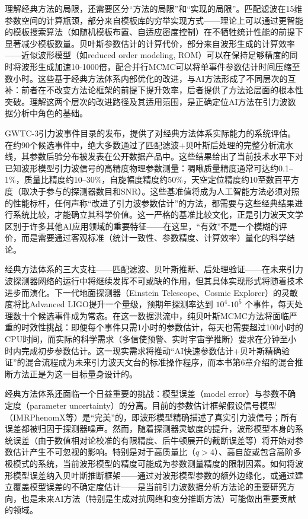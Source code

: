 理解经典方法的局限，还需要区分“方法的局限”和“实现的局限”。匹配滤波在15维参数空间的计算瓶颈，部分来自模板库的穷举实现方式——理论上可以通过更智能的模板搜索算法（如随机模板布置、自适应密度控制）在不牺牲统计性能的前提下显著减少模板数量。贝叶斯参数估计的计算代价，部分来自波形生成的计算效率——近似波形模型（如reduced order modeling, ROM）可以在保持足够精度的同时将波形生成加速10-1000倍，配合并行MCMC可以将单事件参数估计时间压缩至数小时。这些基于经典方法体系内部优化的改进，与AI方法形成了不同层次的互补：前者在不改变方法论框架的前提下提升效率，后者提供了方法论层面的根本性突破。理解这两个层次的改进路径及其适用范围，是正确定位AI方法在引力波数据分析中角色的基础。

GWTC-3引力波事件目录的发布，提供了对经典方法体系实际能力的系统评估。在约90个候选事件中，绝大多数通过了匹配滤波+贝叶斯后处理的完整分析流水线，其参数后验分布被发表在公开数据产品中。这些结果给出了当前技术水平下对已知波形模型引力波信号的高精度物理参数测量：啁啾质量精度通常可达约0.1--1\%，质量比精度约10--30\%，自旋幅度精度约50\%，天空定位精度约10至数百平方度（取决于参与的探测器数目和SNR）。这些基准值将成为人工智能方法必须对照的性能标杆，任何声称“改进了引力波参数估计”的方法，都需要与这些经典结果进行系统比较，才能确立其科学价值。这一严格的基准比较文化，正是引力波天文学区别于许多其他AI应用领域的重要特征——在这里，“有效”不是一个模糊的评价，而是需要通过客观标准（统计一致性、参数精度、计算效率）量化的科学结论。

经典方法体系的三大支柱——匹配滤波、贝叶斯推断、后处理验证——在未来引力波探测器网络的运行中将继续发挥不可或缺的作用，但其具体实现形式将随着技术进步而演化。下一代地面探测器（Einstein Telescope、Cosmic Explorer）的灵敏度将比Advanced LIGO提升一个量级，预期年探测率达到 $10^4$-$10^5$ 个事件，每天处理数十个候选事件成为常态。在这一数据洪流中，纯贝叶斯MCMC方法将面临严重的时效性挑战：即便每个事件只需1小时的参数估计，每天也需要超过100小时的CPU时间，而实际的科学需求（多信使预警、实时宇宙学推断）要求在分钟至小时内完成初步参数估计。这一现实需求将推动“AI快速参数估计+贝叶斯精确验证”的混合流程成为未来引力波天文台的标准操作程序，而本书第6章介绍的混合推断方法正是为这一目标量身设计的。

经典方法体系还面临一个日益重要的挑战：模型误差（model error）与参数不确定度（parameter uncertainty）的分离。目前的参数估计框架假设信号模型（IMRPhenomX等）是“完美”的，即波形模型精确描述了真实引力波信号；所有误差都被归因于探测器噪声。然而，随着探测器灵敏度的提升，波形模型本身的系统误差（由于数值相对论校准的有限精度、后牛顿展开的截断误差等）将开始对参数估计产生不可忽视的影响。特别是对于高质量比（$q > 4$）、高自旋或包含高阶多极模式的系统，当前波形模型的精度可能成为参数测量精度的限制因素。如何将波形模型误差纳入贝叶斯推断框架——通过对波形模型参数的额外边缘化，或通过建立覆盖模型误差的不确定度估计——是当前引力波数据分析方法论的重要研究方向，也是未来AI方法（特别是生成对抗网络和变分推断方法）可能做出重要贡献的领域。

